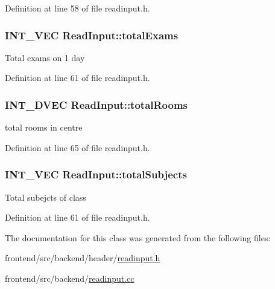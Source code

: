 \-Definition at line 58 of file readinput.\-h.

\hypertarget{classReadInput_aa5fd69afc1c76686f37bcb20805ba551}{
\subsubsection[{total\-Exams}]{\setlength{\rightskip}{0pt plus 5cm}\-I\-N\-T\-\_\-\-V\-E\-C {\bf \-Read\-Input\-::total\-Exams}}}\label{classReadInput_aa5fd69afc1c76686f37bcb20805ba551}
\-Total exams on 1 day 

\-Definition at line 61 of file readinput.\-h.

\hypertarget{classReadInput_a21ae2519b9f3dc9ae938fc670995822f}{
\subsubsection[{total\-Rooms}]{\setlength{\rightskip}{0pt plus 5cm}\-I\-N\-T\-\_\-D\-V\-E\-C {\bf \-Read\-Input\-::total\-Rooms}}}\label{classReadInput_a21ae2519b9f3dc9ae938fc670995822f}
total rooms in centre 

\-Definition at line 65 of file readinput.\-h.

\hypertarget{classReadInput_ad615390a3c9548b63e6081459801d3b3}{
\subsubsection[{total\-Subjects}]{\setlength{\rightskip}{0pt plus 5cm}\-I\-N\-T\-\_\-\-V\-E\-C {\bf \-Read\-Input\-::total\-Subjects}}}\label{classReadInput_ad615390a3c9548b63e6081459801d3b3}
\-Total subejcts of class 

\-Definition at line 61 of file readinput.\-h.



\-The documentation for this class was generated from the following files\-:\begin{DoxyCompactItemize}
\item 
frontend/src/backend/header/\hyperlink{readinput_8h}{readinput.\-h}\item 
frontend/src/backend/\hyperlink{readinput_8cc}{readinput.\-cc}\end{DoxyCompactItemize}
